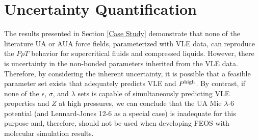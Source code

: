 \documentclass[preprint,letterpaper,floatfix,citeautoscript,aip,jcp]{revtex4-1}
\begin{document}
\section{Uncertainty Quantification} \label{Methods II}

The results presented in Section \ref{Case Study} demonstrate that none of the literature UA or AUA force fields, parameterized with VLE data, can reproduce the $P \rho T$ behavior for supercritical fluids and compressed liquids. However, there is uncertainty in the non-bonded parameters inherited from the VLE data. Therefore, by considering the inherent uncertainty, it is possible that 
a feasible parameter set exists that adequately predicts VLE and $P^{\rm high}$. By contrast, if none of the $\epsilon$, $\sigma$, and $\lambda$ sets is capable of simultaneously predicting VLE properties and $Z$ at high pressures, we can conclude that the UA Mie $\lambda$-6 potential (and Lennard-Jones 12-6 as a special case) is inadequate for this purpose and, therefore, should not be used when developing FEOS with molecular simulation results. 


\end{document}

